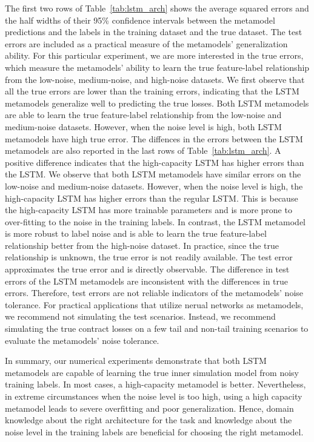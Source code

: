 The first two rows of Table~\ref{tab:lstm_arch} shows the average squared errors and the half widths of their 95\% confidence intervals between the metamodel predictions and the labels in the training dataset and the true dataset.
The test errors are included as a practical measure of the metamodels' generalization ability.
For this particular experiment, we are more interested in the true errors, which measure the metamodels' ability to learn the true feature-label relationship from the low-noise, medium-noise, and high-noise datasets.
We first observe that all the true errors are lower than the training errors, indicating that the LSTM metamodels generalize well to predicting the true losses.
Both LSTM metamodels are able to learn the true feature-label relationship from the low-noise and medium-noise datasets.
However, when the noise level is high, both LSTM metamodels have high true error.
The diffences in the errors between the LSTM metamodels are also reported in the last rows of Table~\ref{tab:lstm_arch}.
A positive difference indicates that the high-capacity LSTM has higher errors than the LSTM.
We observe that both LSTM metamodels have similar errors on the low-noise and medium-noise datasets.
However, when the noise level is high, the high-capacity LSTM has higher errors than the regular LSTM.
This is because the high-capacity LSTM has more trainable parameters and is more prone to over-fitting to the noise in the training labels.
In contrast, the LSTM metamodel is more robust to label noise and is able to learn the true feature-label relationship better from the high-noise dataset.
In practice, since the true relationship is unknown, the true error is not readily available.
The test error approximates the true error and is directly observable.
The difference in test errors of the LSTM metamodels are inconsistent with the differences in true errors.
Therefore, test errors are not reliable indicators of the metamodels' noise tolerance.
For practical applications that utilize nerual networks as metamodels, we recommend not simulating the test scenarios.
Instead, we recommend simulating the true contract losses on a few tail and non-tail training scenarios to evaluate the metamodels' noise tolerance.

In summary, our numerical experiments demonstrate that both LSTM metamodels are capable of learning the true inner simulation model from noisy training labels.
In most cases, a high-capacity metamodel is better.
Nevertheless, in extreme circumstances when the noise level is too high, using a high capacity metamodel leads to severe overfitting and poor generalization.
Hence, domain knowledge about the right architecture for the task and knowledge about the noise level in the training labels are beneficial for choosing the right metamodel.

